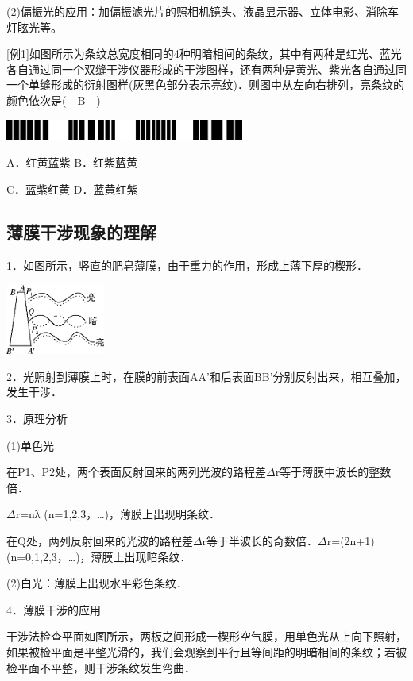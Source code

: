 (2)偏振光的应用：加偏振滤光片的照相机镜头、液晶显示器、立体电影、消除车灯眩光等。

{[}例1{]}如图所示为条纹总宽度相同的4种明暗相间的条纹，其中有两种是红光、蓝光各自通过同一个双缝干涉仪器形成的干涉图样，还有两种是黄光、紫光各自通过同一个单缝形成的衍射图样(灰黑色部分表示亮纹)．则图中从左向右排列，亮条纹的颜色依次是(　B　)

\begin{center}\includegraphics[width=3.09444in,height=0.27361in]{media/image559.png}\end{center}
A．红黄蓝紫 B．红紫蓝黄

C．蓝紫红黄 D．蓝黄红紫

\subsection{薄膜干涉现象的理解}

1．如图所示，竖直的肥皂薄膜，由于重力的作用，形成上薄下厚的楔形．

\begin{center}\includegraphics[width=1.28333in,height=0.91528in]{media/image560.png}\end{center}
2．光照射到薄膜上时，在膜的前表面AA'和后表面BB'分别反射出来，相互叠加，发生干涉．

3．原理分析

(1)单色光

在P1、P2处，两个表面反射回来的两列光波的路程差$\Delta$r等于薄膜中波长的整数倍．

$\Delta$r=nλ (n=1,2,3，\ldots)，薄膜上出现明条纹．

在Q处，两列反射回来的光波的路程差$\Delta$r等于半波长的奇数倍．$\Delta$r=(2n+1)
(n=0,1,2,3，\ldots)，薄膜上出现暗条纹．

(2)白光：薄膜上出现水平彩色条纹．

4．薄膜干涉的应用

干涉法检查平面如图所示，两板之间形成一楔形空气膜，用单色光从上向下照射，如果被检平面是平整光滑的，我们会观察到平行且等间距的明暗相间的条纹；若被检平面不平整，则干涉条纹发生弯曲．


